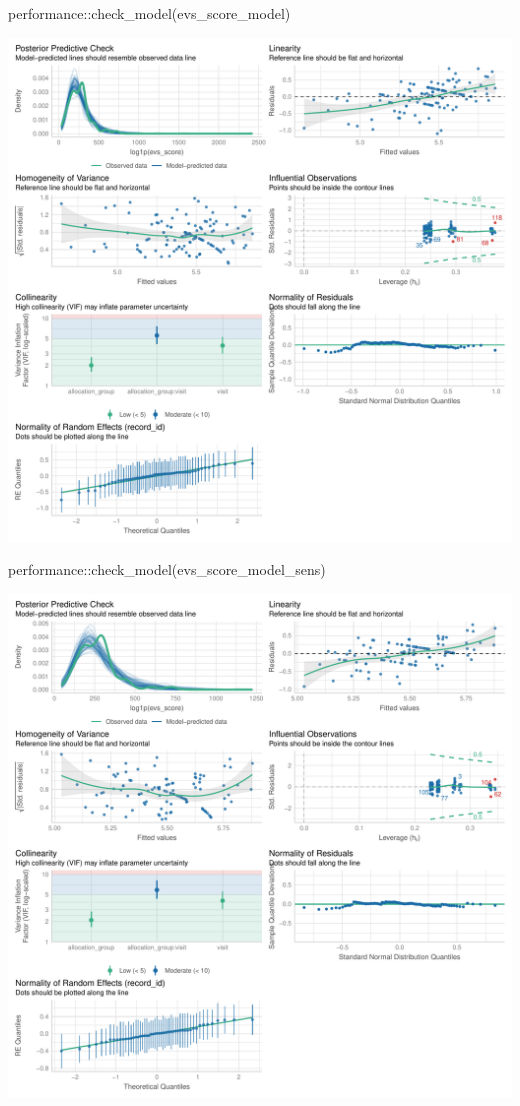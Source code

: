 \documentclass[
  letterpaper,
  DIV=11,
  numbers=noendperiod]{scrartcl}
\newenvironment{Shaded}{\begin{snugshade}}{\end{snugshade}}
\newcommand{\FunctionTok}[1]{\textcolor[rgb]{0.28,0.35,0.67}{#1}}
\newcommand{\NormalTok}[1]{\textcolor[rgb]{0.00,0.23,0.31}{#1}}
\newcommand{\SpecialCharTok}[1]{\textcolor[rgb]{0.37,0.37,0.37}{#1}}
\begin{document}
\begin{Shaded}
\begin{Highlighting}[]
\NormalTok{performance}\SpecialCharTok{::}\FunctionTok{check\_model}\NormalTok{(evs\_score\_model)}
\end{Highlighting}
\end{Shaded}

\includegraphics{Outcomes_V1V2V3_files/figure-pdf/evs_score_4-1.pdf}

\begin{Shaded}
\begin{Highlighting}[]
\NormalTok{performance}\SpecialCharTok{::}\FunctionTok{check\_model}\NormalTok{(evs\_score\_model\_sens)}
\end{Highlighting}
\end{Shaded}

\includegraphics{Outcomes_V1V2V3_files/figure-pdf/evs_score_4-2.pdf}
\end{document}
